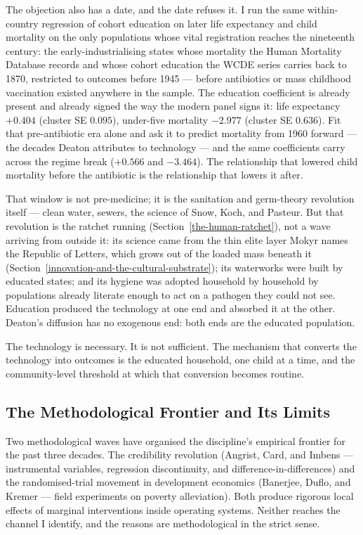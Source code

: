 \documentclass[12pt,letterpaper]{article}
\begin{document}
The objection also has a date, and the date refuses it. I run the same
within-country regression of cohort education on later life expectancy
and child mortality on the only populations whose vital registration
reaches the nineteenth century: the early-industrialising states whose
mortality the Human Mortality Database records and whose cohort
education the WCDE series carries back to 1870, restricted to outcomes
before 1945 --- before antibiotics or mass childhood vaccination
existed anywhere in the sample. The education coefficient is already
present and already signed the way the modern panel signs it: life
expectancy $+0.404$ (cluster SE $0.095$), under-five mortality
$-2.977$ (cluster SE $0.636$). Fit that pre-antibiotic era alone and
ask it to predict mortality from 1960 forward --- the decades Deaton
attributes to technology --- and the same coefficients carry across the
regime break ($+0.566$ and $-3.464$). The relationship that lowered
child mortality before the antibiotic is the relationship that lowers
it after.

That window is not pre-medicine; it is the sanitation and germ-theory
revolution itself --- clean water, sewers, the science of Snow, Koch,
and Pasteur. But that revolution is the ratchet running
(Section~\ref{the-human-ratchet}), not a wave arriving from outside it:
its science came from the thin elite layer Mokyr names the Republic of
Letters, which grows out of the loaded mass beneath it
(Section~\ref{innovation-and-the-cultural-substrate}); its waterworks
were built by educated states; and its hygiene was adopted household by
household by populations already literate enough to act on a pathogen
they could not see. Education produced the technology at one end and
absorbed it at the other. Deaton's diffusion has no exogenous end: both
ends are the educated population.

The technology is necessary. It is not sufficient. The mechanism that converts the technology into outcomes is the educated household, one child at a time, and the community-level threshold at which that conversion becomes routine.

\subsection{The Methodological Frontier and Its Limits}\label{methodological-frontier}

Two methodological waves have organised the discipline's empirical
frontier for the past three decades. The credibility revolution
(Angrist, Card, and Imbens --- instrumental variables, regression
discontinuity, and difference-in-differences) and the randomised-trial
movement in development economics (Banerjee, Duflo, and Kremer ---
field experiments on poverty alleviation). Both produce
rigorous local effects of marginal interventions inside operating
systems. Neither reaches the channel I identify, and the
reasons are methodological in the strict sense.
\end{document}
